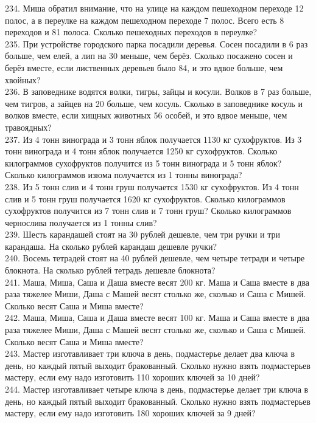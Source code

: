 234. Миша обратил внимание, что на улице на каждом пешеходном переходе 12 полос, а в переулке на каждом пешеходном переходе 7 полос. Всего есть 8 переходов и 81 полоса. Сколько пешеходных переходов в переулке?\\
235. При устройстве городского парка посадили деревья. Сосен посадили в 6 раз больше, чем елей, а лип на 30 меньше, чем берёз. Сколько посажено сосен и берёз вместе, если лиственных деревьев было 84, и это вдвое больше, чем хвойных?\\
236. В заповеднике водятся волки, тигры, зайцы и косули. Волков в 7 раз больше, чем тигров, а зайцев на 20 больше, чем косуль. Сколько в заповеднике косуль и волков вместе, если хищных животных 56 особей, и это вдвое меньше, чем травоядных?\\
237. Из 4 тонн винограда и 3 тонн яблок получается 1130 кг сухофруктов. Из 3 тонн винограда и 4 тонн яблок получается 1250 кг сухофруктов. Сколько килограммов сухофруктов получится из 5 тонн винограда и 5 тонн яблок? Сколько килограммов изюма получается из 1 тонны винограда?\\
238. Из 5 тонн слив и 4 тонн груш получается 1530 кг сухофруктов. Из 4 тонн слив и 5 тонн груш получается 1620 кг сухофруктов. Сколько килограммов сухофруктов получится из 7 тонн слив и 7 тонн груш? Сколько килограммов чернослива получается из 1 тонны слив?\\
239. Шесть карандашей стоят на 30 рублей дешевле, чем три ручки и три карандаша. На сколько рублей карандаш дешевле ручки?\\
240. Восемь тетрадей стоят на 40 рублей дешевле, чем четыре тетради и четыре блокнота. На сколько рублей тетрадь дешевле блокнота?\\
241. Маша, Миша, Саша и Даша вместе  весят 200 кг. Маша и Саша вместе в два раза тяжелее Миши, Даша с Машей весят столько же, сколько и Саша с  Мишей. Сколько весят Саша и Миша вместе?\\
242. Маша, Миша, Саша и Даша вместе  весят 100 кг. Маша и Саша вместе в два раза тяжелее Миши, Даша с Машей весят столько же, сколько и Саша с  Мишей. Сколько весят Саша и Миша вместе?\\
243. Мастер изготавливает три ключа в день, подмастерье делает два ключа в день, но каждый пятый выходит бракованный. Сколько нужно взять подмастерьев мастеру, если ему надо изготовить 110 хороших ключей за 10 дней?\\
244. Мастер изготавливает четыре ключа в день, подмастерье делает три ключа в день, но каждый пятый выходит бракованный. Сколько нужно взять подмастерьев мастеру, если ему надо изготовить 180 хороших ключей за 9 дней?\\
